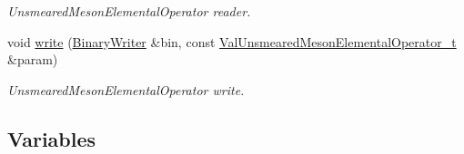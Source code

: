 \begin{DoxyCompactItemize}
\begin{DoxyCompactList}\small\item\em Unsmeared\+Meson\+Elemental\+Operator reader. \end{DoxyCompactList}\item 
void \mbox{\hyperlink{namespaceHadron_a78737ee2e9f7f708d926ec9f531c8f61}{write}} (\mbox{\hyperlink{classADATIO_1_1BinaryWriter}{Binary\+Writer}} \&bin, const \mbox{\hyperlink{structHadron_1_1ValUnsmearedMesonElementalOperator__t}{Val\+Unsmeared\+Meson\+Elemental\+Operator\+\_\+t}} \&param)
\begin{DoxyCompactList}\small\item\em Unsmeared\+Meson\+Elemental\+Operator write. \end{DoxyCompactList}\end{DoxyCompactItemize}
\subsection*{Variables}
